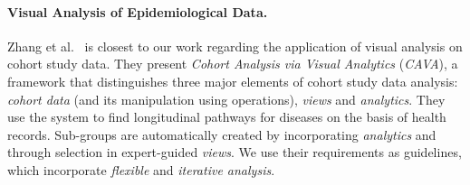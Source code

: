 \documentclass[journal]{style/vgtc} 			          %
\begin{document}
\paragraph{Visual Analysis of Epidemiological Data.}
Zhang et al.~\cite{Zhang2014, Gotz2014} is closest to our work regarding the application of visual analysis on cohort study data.
They present \emph{Cohort Analysis via Visual Analytics} (\emph{CAVA}), a framework that distinguishes three major elements of cohort study data analysis: \emph{cohort data} (and its manipulation using operations), \emph{views} and \emph{analytics}.
They use the system to find longitudinal pathways for diseases on the basis of health records.
Sub-groups are automatically created by incorporating \emph{analytics} and through selection in expert-guided \emph{views}.
We use their requirements as guidelines, which incorporate \emph{flexible} and \emph{iterative analysis}. %
\end{document}
